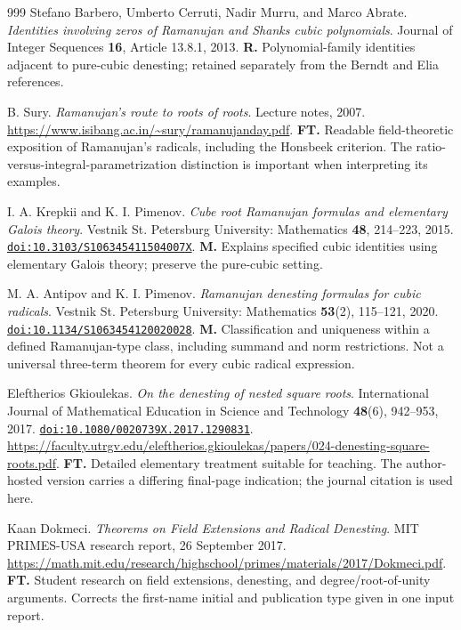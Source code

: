 \documentclass[11pt,a4paper]{article}
\newcommand{\doi}[1]{\href{https://doi.org/#1}{\nolinkurl{doi:#1}}}
\let\sourceurl\url
\theoremstyle{definition}
\theoremstyle{remark}
\numberwithin{equation}{section}
\begin{document}
\begin{thebibliography}{999}
Stefano Barbero, Umberto Cerruti, Nadir Murru, and Marco Abrate.
\emph{Identities involving zeros of Ramanujan and Shanks cubic polynomials}.
Journal of Integer Sequences \textbf{16}, Article 13.8.1, 2013.
\textbf{R.} Polynomial-family identities adjacent to pure-cubic denesting; retained separately from the Berndt and Elia references.

B. Sury.
\emph{Ramanujan's route to roots of roots}.
Lecture notes, 2007.
\sourceurl{https://www.isibang.ac.in/~sury/ramanujanday.pdf}.
\textbf{FT.} Readable field-theoretic exposition of Ramanujan's radicals, including the Honsbeek criterion. The ratio-versus-integral-parametrization distinction is important when interpreting its examples.

I. A. Krepkii and K. I. Pimenov.
\emph{Cube root Ramanujan formulas and elementary Galois theory}.
Vestnik St. Petersburg University: Mathematics \textbf{48}, 214--223, 2015.
\doi{10.3103/S106345411504007X}.
\textbf{M.} Explains specified cubic identities using elementary Galois theory; preserve the pure-cubic setting.

M. A. Antipov and K. I. Pimenov.
\emph{Ramanujan denesting formulas for cubic radicals}.
Vestnik St. Petersburg University: Mathematics \textbf{53}(2), 115--121, 2020.
\doi{10.1134/S1063454120020028}.
\textbf{M.} Classification and uniqueness within a defined Ramanujan-type class, including summand and norm restrictions. Not a universal three-term theorem for every cubic radical expression.

Eleftherios Gkioulekas.
\emph{On the denesting of nested square roots}.
International Journal of Mathematical Education in Science and Technology \textbf{48}(6), 942--953, 2017.
\doi{10.1080/0020739X.2017.1290831}.
\sourceurl{https://faculty.utrgv.edu/eleftherios.gkioulekas/papers/024-denesting-square-roots.pdf}.
\textbf{FT.} Detailed elementary treatment suitable for teaching. The author-hosted version carries a differing final-page indication; the journal citation is used here.

Kaan Dokmeci.
\emph{Theorems on Field Extensions and Radical Denesting}.
MIT PRIMES-USA research report, 26 September 2017.
\sourceurl{https://math.mit.edu/research/highschool/primes/materials/2017/Dokmeci.pdf}.
\textbf{FT.} Student research on field extensions, denesting, and degree/root-of-unity arguments. Corrects the first-name initial and publication type given in one input report.


\end{thebibliography}
\end{document}
